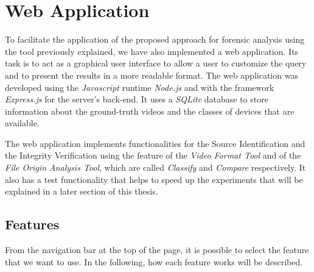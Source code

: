 \section{Web Application}

To facilitate the application of the proposed approach for forensic analysis using the tool previously explained, we have also implemented a web application. Its task is to act as a graphical user interface to allow a user to customize the query and to present the results in a more readable format. The web application was developed using the \emph{Javascript} runtime \emph{Node.js} \cite{node} and with the framework \emph{Express.js} \cite{express} for the server's back-end. It uses a \emph{SQLite} database to store information about the ground-truth videos and the classes of devices that are available.

The web application implements functionalities for the Source Identification and the Integrity Verification using the feature of the \emph{Video Format Tool} and of the \emph{File Origin Analysis Tool}, which are called \emph{Classify} and \emph{Compare} respectively.
It also has a test functionality that helps to speed up the experiments that will be explained in a later section of this thesis.

\subsection{Features}

From the navigation bar at the top of the page, it is possible to select the feature that we want to use. In the following, how each feature works will be described.

